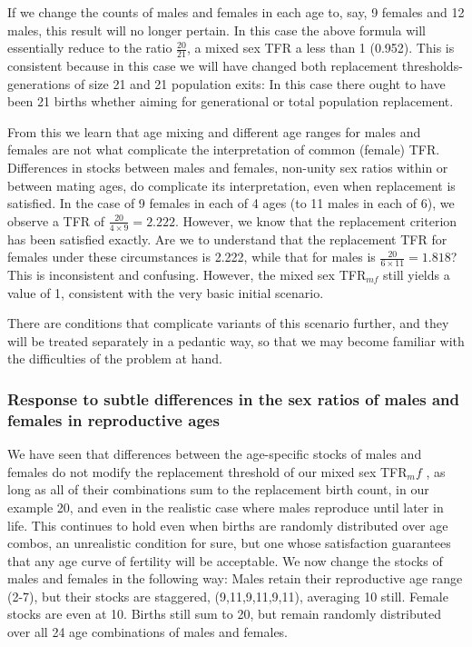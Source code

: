 \documentclass[reqno,12pt,oneside,a4paper]{report} %
\theoremstyle{plain}
\theoremstyle{definition}
\theoremstyle{remark}
\numberwithin{theorem}{chapter}     %
\begin{document}
If we change the counts of males and females in each age to, say, 9 females and 12 males, this result will no longer pertain. In this case the above formula will essentially reduce to the ratio $\frac{20}{21}$, a mixed sex TFR a less than 1 (0.952). This is consistent because in this case we will have changed both replacement thresholds- generations of size 21 and 21 population exits: In this case there ought to have been 21 births whether aiming for generational or total population replacement. 

From this we learn that age mixing and different age ranges for males and females are not what complicate the interpretation of common (female) TFR. Differences in stocks between males and females, non-unity sex ratios within or between mating ages, do complicate its interpretation, even when replacement is satisfied. In the case of 9 females in each of 4 ages (to 11 males in each of 6), we observe a TFR of $\frac{20}{4\times9}=2.222$. However, we know that the replacement criterion has been satisfied exactly. Are we to understand that the replacement TFR for females under these circumstances is 2.222, while that for males is $\frac{20}{6\times11}=1.818$? This is inconsistent and confusing. However, the mixed sex TFR$_{mf}$ still yields a value of 1, consistent with the very basic initial scenario.

There are conditions that complicate variants of this scenario further, and they will be treated separately in a pedantic way, so that we may become familiar with the difficulties of the problem at hand.

		\subsubsection{Response to subtle differences in the sex ratios of males and females in reproductive ages}

We have seen that differences between the age-specific stocks of males and females do not modify the replacement threshold of our mixed sex TFR$_mf$ , as long as all of their combinations sum to the replacement birth count, in our example 20, and even in the realistic case where males reproduce until later in life.  This continues to hold even when births are randomly distributed over age combos, an unrealistic condition for sure, but one whose satisfaction guarantees that any age curve of fertility will be acceptable. We now change the stocks of males and females in the following way: Males retain their reproductive age range (2-7), but their stocks are staggered, (9,11,9,11,9,11), averaging 10 still. Female stocks are even at 10. Births still sum to 20, but remain randomly distributed over all 24 age combinations of males and females.
\end{document}
